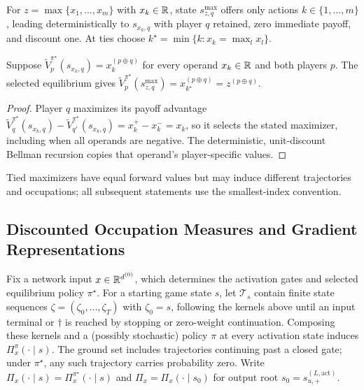 \begin{definition}\label{ptnb:def:maxpool-subgame}
For $z=\max\{x_1,\dots,x_m\}$ with $x_k\in\mathbb{R}$, state $s_{z,q}^{\max}$ offers only actions $k\in\{1,\dots,m\}$,
leading deterministically to $s_{x_k,q}$ with player $q$ retained, zero immediate payoff, and
discount one. At ties choose $k^\star=\min\{k:x_k=\max_l x_l\}$.
\end{definition}
\begin{proposition}\label{ptnb:prop:maxpool-equivalence}
Suppose $\tilde V_p^{\pi^\star}(s_{x_k,q})=x_k^{(p\oplus q)}$ for every operand $x_k\in\mathbb{R}$ and both players $p$.
The selected equilibrium gives
$\tilde V_p^{\pi^\star}(s_{z,q}^{\max})=x_{k^\star}^{(p\oplus q)}=z^{(p\oplus q)}$.
\end{proposition}
\begin{proof}
Player $q$ maximizes its payoff advantage $\tilde V_q^{\pi^\star}(s_{x_k,q})-\tilde V_{q'}^{\pi^\star}(s_{x_k,q})=x_k^+-x_k^-=x_k$, so it selects the stated maximizer, including when all operands are negative. The deterministic, unit-discount Bellman recursion copies that operand's player-specific values.
\end{proof}
Tied maximizers have equal forward values but may induce different trajectories and occupations;
all subsequent statements use the smallest-index convention.

\subsection{Discounted Occupation Measures and Gradient Representations}\label{ptnb:app:occ-deriv}\label{subsec:gradient_occupation}

\begin{definition}\label{ptnb:def:trajectory-distribution}
Fix a network input $x\in\mathbb{R}^{d^{(0)}}$, which determines the activation gates and selected equilibrium policy $\pi^\star$. For a starting game state $s$, let $\mathcal T_s$ contain finite state sequences
$\zeta=(\zeta_0,\dots,\zeta_T)$ with $\zeta_0=s$, following the kernels above until an input
terminal or $\dagger$ is reached by stopping or zero-weight continuation. Composing these kernels and a
(possibly stochastic) policy $\pi$ at every activation state induces $\Pi_x^\pi(\cdot\mid s)$.
The ground set includes trajectories continuing past a closed gate; under $\pi^\star$, any such trajectory carries probability zero. Write $\Pi_x(\cdot\mid s)=\Pi_x^{\pi^\star}(\cdot\mid s)$ and
$\Pi_x=\Pi_x(\cdot\mid s_0)$ for output root $s_0=s_{u,+}^{(L,\mathrm{act})}$.
\end{definition}

